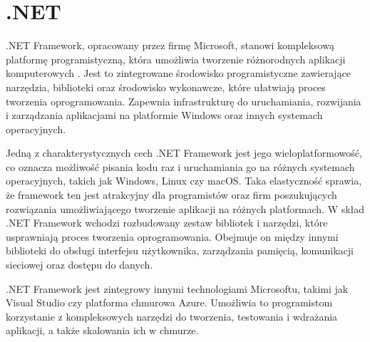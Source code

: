 \section{.NET}

.NET Framework, opracowany przez firmę Microsoft, stanowi kompleksową platformę programistyczną, która umożliwia tworzenie różnorodnych aplikacji komputerowych \cite{microsoftNETBuild}.
Jest to zintegrowane środowisko programistyczne zawierające narzędzia, biblioteki oraz środowisko wykonawcze, które ułatwiają proces tworzenia oprogramowania.
Zapewnia infrastrukturę do uruchamiania, rozwijania i zarządzania aplikacjami na platformie Windows oraz innych systemach operacyjnych.

Jedną z charakterystycznych cech .NET Framework jest jego wieloplatformowość, co oznacza możliwość pisania kodu raz i uruchamiania go na różnych systemach operacyjnych, takich jak Windows, Linux czy macOS.
Taka elastyczność sprawia, że framework ten jest atrakcyjny dla programistów oraz firm poszukujących rozwiązania umożliwiającego tworzenie aplikacji na różnych platformach.
W skład .NET Framework wchodzi rozbudowany zestaw bibliotek i narzędzi, które usprawniają proces tworzenia oprogramowania.
Obejmuje on między innymi biblioteki do obsługi interfejsu użytkownika, zarządzania pamięcią, komunikacji sieciowej oraz dostępu do danych.

.NET Framework jest zintegrowy innymi technologiami Microsoftu, takimi jak Visual Studio czy platforma chmurowa Azure.
Umożliwia to programistom korzystanie z kompleksowych narzędzi do tworzenia, testowania i wdrażania aplikacji, a także skalowania ich w chmurze.